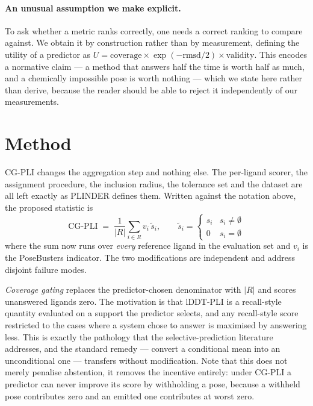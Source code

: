 \documentclass{article} %
\begin{document}
\paragraph{An unusual assumption we make explicit.} To ask whether a metric ranks
correctly, one needs a correct ranking to compare against. We obtain it by construction
rather than by measurement, defining the utility of a predictor as
$U = \text{coverage} \times \exp(-\mathrm{rmsd}/2) \times \text{validity}$. This encodes
a normative claim --- a method that answers half the time is worth half as much, and a
chemically impossible pose is worth nothing --- which we state here rather than derive,
because the reader should be able to reject it independently of our measurements.

\section{Method}
\label{sec:method}
CG-PLI changes the aggregation step and nothing else. The per-ligand scorer, the
assignment procedure, the inclusion radius, the tolerance set and the dataset are all
left exactly as PLINDER defines them. Written against the notation above, the proposed
statistic is
$$
\mathrm{CG\text{-}PLI} \;=\; \frac{1}{|R|}\sum_{i \in R} v_i \, \tilde{s}_i ,
\qquad
\tilde{s}_i = \begin{cases} s_i & s_i \neq \emptyset \\ 0 & s_i = \emptyset \end{cases}
$$
where the sum now runs over \emph{every} reference ligand in the evaluation set and
$v_i$ is the PoseBusters indicator. The two modifications are independent and address
disjoint failure modes.

\emph{Coverage gating} replaces the predictor-chosen denominator with $|R|$ and scores
unanswered ligands zero. The motivation is that lDDT-PLI is a recall-style quantity
evaluated on a support the predictor selects, and any recall-style score restricted to
the cases where a system chose to answer is maximised by answering less. This is exactly
the pathology that the selective-prediction literature addresses, and the standard
remedy --- convert a conditional mean into an unconditional one --- transfers without
modification. Note that this does not merely penalise abstention, it removes the
incentive entirely: under CG-PLI a predictor can never improve its score by withholding
a pose, because a withheld pose contributes zero and an emitted one contributes at worst
zero.
\end{document}
